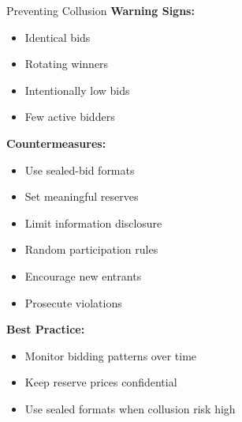 \documentclass[xcolor={x11names}, aspectratio=169 ]{beamer}
\begin{document}
\begin{frame}{Preventing Collusion}
\textbf{Warning Signs:}
\begin{itemize}
  \item Identical bids
  \item Rotating winners
  \item Intentionally low bids
  \item Few active bidders
\end{itemize}

\textbf{Countermeasures:}
\begin{itemize}
  \item Use sealed-bid formats
  \item Set meaningful reserves
  \item Limit information disclosure
  \item Random participation rules
  \item Encourage new entrants
  \item Prosecute violations
\end{itemize}

\textbf{Best Practice:}
\begin{itemize}
  \item Monitor bidding patterns over time
  \item Keep reserve prices confidential
  \item Use sealed formats when collusion risk high
\end{itemize}
\end{frame}
\end{document}
